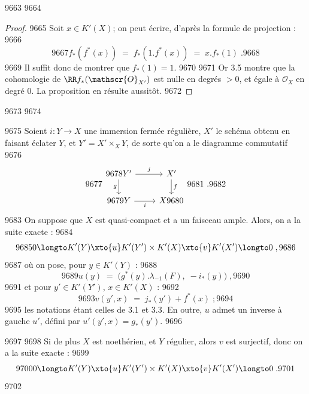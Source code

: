   9663	
  9664	\begin{proof}
  9665	Soit $x \in K'(X)$; on peut écrire, d'après la formule de projection :
  9666	\[
  9667	f_*(f^*(x)) \; = \; f_*(1 . f^*(x)) \; = \; x . f_*(1)\; .
  9668	\]
  9669	Il suffit donc de montrer que $f_*(1) = 1$.
  9670	
  9671	Or 3.5 montre que la cohomologie de $\RR f_*(\mathscr{O}_{X'})$ est nulle en degrés $> 0$, et égale à $\mathscr{O}_X$ en degré $0$. La proposition en résulte aussitôt.
  9672	\end{proof}
  9673	
  9674	\begin{theoreme}[3.7]%
  9675	Soient $i : Y \to X$ une immersion fermée régulière, $X'$ le schéma obtenu en faisant éclater $Y$, et $Y' = X' \times_X Y$, de sorte qu'on a le diagramme commutatif
  9676	\[
  9677	\begin{tikzcd}
  9678	Y' \arrow[r, "j"] \arrow[d, "g"'] & X' \arrow[d, "f"] \\
  9679	Y \arrow[r, "i"'] & X
  9680	\end{tikzcd}
  9681	\ .
  9682	\]
  9683	On suppose que $X$ est quasi-compact et a un faisceau ample. Alors, on a la suite exacte :
  9684	\[
  9685	0 \longto K'(Y) \xto{u} K'(Y') \times K'(X) \xto{v} K'(X') \longto 0\; ,
  9686	\]
  9687	où on pose, pour $y \in K'(Y)$ :
  9688	\[
  9689	u(y) \; = \; \bigl(g^*(y).\lambda_{-1}(F),\; -i_*(y)\bigr)\; ,
  9690	\]
  9691	et pour $y' \in K'(Y')$, $x \in K'(X)$ :
  9692	\[
  9693	v(y', x) \; = \; j_*(y') + f^*(x)\; ;
  9694	\]
  9695	les notations étant celles de 3.1 et 3.3. En outre, $u$ admet un inverse à gauche $u'$, défini par $u'(y',x) = g_*(y')$.
  9696	\end{theoreme}
  9697	
  9698	Si de plus $X$ est noethérien, et $Y$ régulier, alors $v$ est surjectif, donc on a la suite exacte :
  9699	\[
  9700	0 \longto K'(Y) \xto{u} K'(Y') \times K'(X) \xto{v} K'(X') \longto 0\; .
  9701	\]
  9702	

